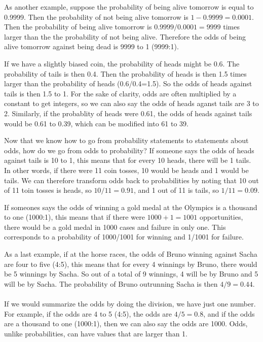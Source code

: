 \documentclass[]{book}\usepackage[]{graphicx}\usepackage[]{color}
\begin{document}
As another example, suppose the probability of being alive tomorrow is equal to 0.9999. Then the probability of not being alive tomorrow is $1-0.9999=0.0001$. Then the probability of being alive tomorrow is $0.9999/0.0001=9999$ times larger than the the probability of not being alive. Therefore the odds of being alive tomorrow against being dead is 9999 to 1 (9999:1).

If we have a slightly biased coin, the probability of heads might be 0.6. The probability of tails is then 0.4. Then the probability of heads is then 1.5 times larger than the probability of heads (0.6/0.4=1.5). So the odds of heads against tails is then 1.5 to 1. For the sake of clarity, odds are often multiplied by a constant to get integers, so we can also say the odds of heads aganst tails are 3 to 2. Similarly, if the probablity of heads were 0.61, the odds of heads against tails would be 0.61 to 0.39, which can be modified into 61 to 39.

Now that we know how to go from probability statements to statements about odds, how do we go from odds to probability? If someone says the odds of heads against tails is 10 to 1, this means that for every 10 heads, there will be 1 tails. In other words, if there were 11 coin tosses, 10 would be heads and 1 would be tails. We can therefore transform odds back to probabilities by noting that 10 out of 11 toin tosses is heads, so $10/11 = 0.91$, and 1 out of 11 is tails, so $1/11=0.09$.

If someones says the odds of winning a gold medal at the Olympics is a thousand to one (1000:1), this means that if there were $1000+1=1001$ opportunities, there would be a gold medal in 1000 cases and failure in only one. This corresponds to a probability of 1000/1001 for winning and 1/1001 for failure.

As a last example, if at the horse races, the odds of Bruno winning against Sacha are four to five (4:5), this means that for every 4 winnings by Bruno, there would be 5 winnings by Sacha. So out of a total of 9 winnings, 4 will be by Bruno and 5 will be by Sacha. The probability of Bruno outrunning Sacha is then $4/9=0.44$.
\\
\\
If we would summarize the odds by doing the division, we have just one number. For example, if the odds are 4 to 5 (4:5), the odds are $4/5=0.8$, and if the odds are a thousand to one (1000:1), then we can also say the odds are 1000. Odds, unlike probabilities, can have values that are larger than 1. 
\end{document}
